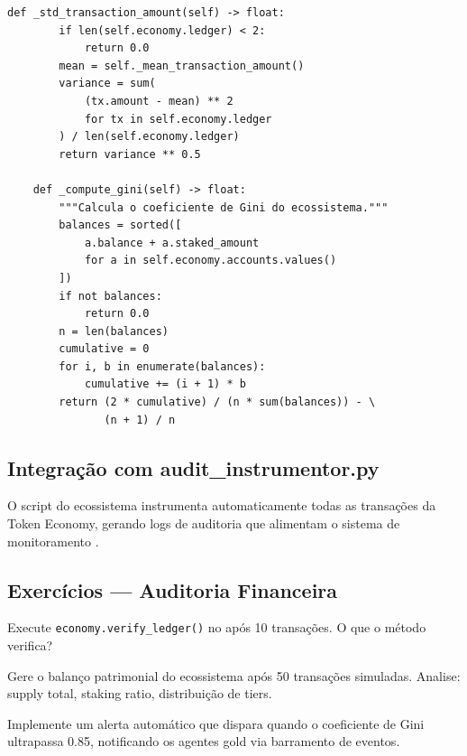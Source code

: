 \begin{lstlisting}[caption={Detector de anomalias economicas},
                  label={lst:anomaly-detector}]
    def _std_transaction_amount(self) -> float:
        if len(self.economy.ledger) < 2:
            return 0.0
        mean = self._mean_transaction_amount()
        variance = sum(
            (tx.amount - mean) ** 2
            for tx in self.economy.ledger
        ) / len(self.economy.ledger)
        return variance ** 0.5

    def _compute_gini(self) -> float:
        """Calcula o coeficiente de Gini do ecossistema."""
        balances = sorted([
            a.balance + a.staked_amount
            for a in self.economy.accounts.values()
        ])
        if not balances:
            return 0.0
        n = len(balances)
        cumulative = 0
        for i, b in enumerate(balances):
            cumulative += (i + 1) * b
        return (2 * cumulative) / (n * sum(balances)) - \
               (n + 1) / n
\end{lstlisting}

\subsection{Integração com audit\_instrumentor.py}

O script  do ecossistema
instrumenta automaticamente todas as transações da Token Economy,
gerando logs de auditoria que alimentam o sistema de
monitoramento \cite{opencode2026ecosystem}.

\subsection{Exercícios — Auditoria Financeira}

\begin{exercicio}
Execute \lstinline{economy.verify_ledger()} no \opencodeeco{}
após 10 transações. O que o método verifica?
\end{exercicio}

\begin{exercicio}
Gere o balanço patrimonial do ecossistema após 50 transações
simuladas. Analise: supply total, staking ratio, distribuição
de tiers.
\end{exercicio}

\begin{exercicio}
Implemente um alerta automático que dispara quando o coeficiente
de Gini ultrapassa 0.85, notificando os agentes gold via
barramento de eventos.
\end{exercicio}

